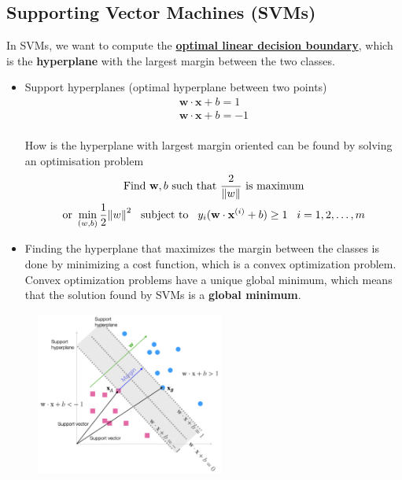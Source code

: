 \documentclass[a4paper,10pt]{article}
\begin{document}
\subsection{Supporting Vector Machines (SVMs)}
In SVMs, we want to compute the \underline{\textbf{optimal linear decision boundary}}, which is the \textbf{hyperplane} with the largest margin between the two classes.
\begin{itemize}
    \item Support hyperplanes (optimal hyperplane between two points)
    \begin{gather*}
        \mathbf{w}\cdot\mathbf{x} + b = 1\\
        \mathbf{w}\cdot\mathbf{x} + b = -1\\
    \end{gather*}

    \vspace*{-0.8cm}
    How is the hyperplane with largest margin oriented can be found by solving an optimisation problem
    \begin{gather*}
        \text{Find }\mathbf{w},b\text{ such that }\frac{2}{\lVert w \rVert}\text{ is maximum}\\
        \text{or }\min\limits_{(w,b)}\frac{1}{2}{\lVert w \rVert}^2\hspace*{0.3cm}\text{subject to}\hspace*{0.3cm}y_i(\mathbf{w}\cdot\mathbf{x}^{(i)}+b)\geq1\hspace*{0.3cm}i = 1,2,\dots,m
    \end{gather*}
    \item Finding the hyperplane that maximizes the margin between the classes is done by minimizing a cost function, which is a convex optimization problem. Convex optimization problems have a unique global minimum, which means that the solution found by SVMs is a \textbf{global minimum}.
\end{itemize}

\begin{figure}[H]
    \centering
    \includegraphics[width =0.55\textwidth]{svm.png}
\end{figure}
\end{document}
